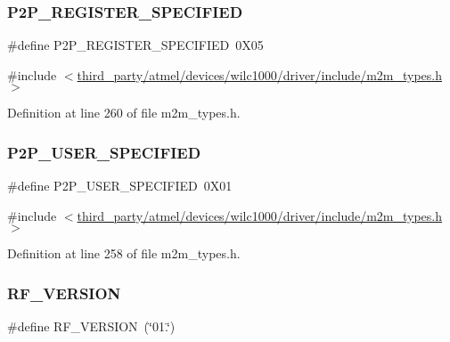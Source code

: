 \subsubsection{\texorpdfstring{P2\+P\+\_\+\+R\+E\+G\+I\+S\+T\+E\+R\+\_\+\+S\+P\+E\+C\+I\+F\+I\+ED}{P2P\_REGISTER\_SPECIFIED}}
{\footnotesize\ttfamily \#define P2\+P\+\_\+\+R\+E\+G\+I\+S\+T\+E\+R\+\_\+\+S\+P\+E\+C\+I\+F\+I\+ED~0\+X05}



{\ttfamily \#include $<$\hyperlink{m2m__types_8h}{third\+\_\+party/atmel/devices/wilc1000/driver/include/m2m\+\_\+types.\+h}$>$}



Definition at line 260 of file m2m\+\_\+types.\+h.

\mbox{\label{group__WlanDefines_ga47c2d105f8811042e073e24da159f7e0}} 
\subsubsection{\texorpdfstring{P2\+P\+\_\+\+U\+S\+E\+R\+\_\+\+S\+P\+E\+C\+I\+F\+I\+ED}{P2P\_USER\_SPECIFIED}}
{\footnotesize\ttfamily \#define P2\+P\+\_\+\+U\+S\+E\+R\+\_\+\+S\+P\+E\+C\+I\+F\+I\+ED~0\+X01}



{\ttfamily \#include $<$\hyperlink{m2m__types_8h}{third\+\_\+party/atmel/devices/wilc1000/driver/include/m2m\+\_\+types.\+h}$>$}



Definition at line 258 of file m2m\+\_\+types.\+h.

\mbox{\label{group__WlanDefines_gaf046e0683b1afb87ebe80f2015fc46c4}} 
\subsubsection{\texorpdfstring{R\+F\+\_\+\+V\+E\+R\+S\+I\+ON}{RF\_VERSION}}
{\footnotesize\ttfamily \#define R\+F\+\_\+\+V\+E\+R\+S\+I\+ON~(\char`\"{}01.\char`\"{})}



